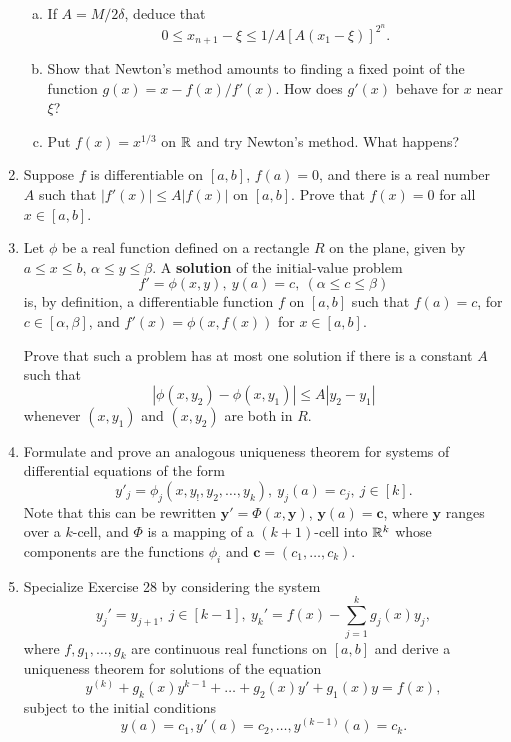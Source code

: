 \begin{enumerate}[1.]
\begin{enumerate}[(a)]
        \item If $A = M/2\delta$, deduce that
            \[
                0 \le x_{n+1} - \xi \le 1/A [A(x_1 - \xi)]^{2^n}.
            \]

        \item Show that Newton's method amounts to finding a fixed point of the function $g(x) = x - f(x)/f'(x)$. How does $g'(x)$ behave for $x$ near $\xi$?

        \item Put $f(x) = x^{1/3}$ on $\mathbb{R}$ and try Newton's method. What happens?
    \end{enumerate}
\item %
    Suppose $f$ is differentiable on $[a, b]$, $f(a) = 0$, and there is a real number $A$ such that $|f'(x)| \le A|f(x)|$ on $[a, b]$. Prove that $f(x) = 0$ for all $x \in [a, b]$. 
\item %
    Let $\phi$ be a real function defined on a rectangle $R$ on the plane, given by $a \le x \le b$, $\alpha \le y \le \beta$. A \textbf{solution} of the initial-value problem
    \[
        f' = \phi(x, y),\ y(a) = c,\ (\alpha \le c \le \beta)
    \]
    is, by definition, a differentiable function $f$ on $[a, b]$ such that $f(a) = c$, for $c \in [\alpha, \beta]$, and $f'(x) = \phi(x, f(x))$ for $x \in [a, b]$.

    Prove that such a problem has at most one solution if there is a constant $A$ such that 
    \[
        \left| \phi(x, y_2) - \phi(x, y_1) \right| \le A |y_2 - y_1|
    \]
    whenever $(x, y_1)$ and $(x, y_2)$ are both in $R$.
\item %
    Formulate and prove an analogous uniqueness theorem for systems of differential equations of the form
    \[
        y'_j = \phi_j(x, y_!, y_2, \dotsc, y_k),\ y_j(a) = c_j,\ j \in [k].
    \]
    Note that this can be rewritten $\textbf{y}' = \Phi(x, \textbf{y})$, $\textbf{y}(a) = \textbf{c}$, where $\textbf{y}$ ranges over a $k$-cell, and $\Phi$ is a mapping of a $(k+1)$-cell into $\mathbb{R}^k$ whose components are the functions $\phi_i$ and $\textbf{c} = (c_1, \dotsc, c_k)$. 
\item %
    Specialize Exercise 28 by considering the system
    \[
        y_j' = y_{j+1},\ j \in [k-1],\ y_k' = f(x) - \sum_{j=1}^{k} g_j(x)y_j,
    \]
    where $f, g_1, \dotsc, g_k$ are continuous real functions on $[a, b]$ and derive a uniqueness theorem for solutions of the equation
    \[
        y^{(k)} + g_k(x)y^{k-1} + \dotsc + g_2(x) y' + g_1(x)y = f(x),
    \]
    subject to the initial conditions
    \[
        y(a) = c_1, y'(a) = c_2, \dotsc, y^{(k-1)}(a) = c_k.
    \]

\end{enumerate}
